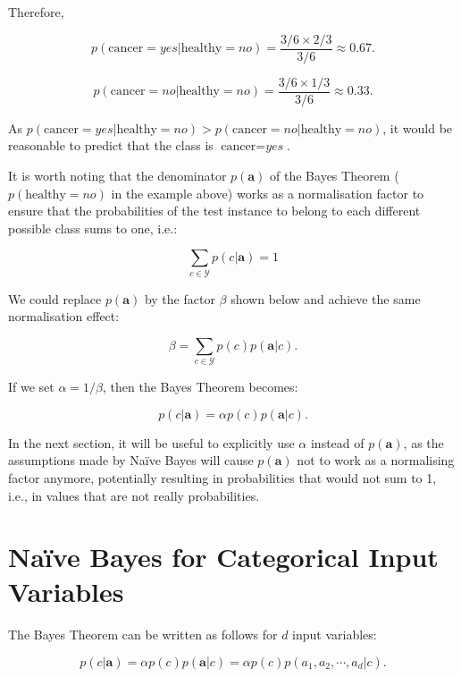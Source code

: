 \vspace{1cm}
Therefore,

\[p(\text{cancer}=\textit{yes}|\text{healthy} = \textit{no}) = \frac{3/6 \times 2/3}{3/6} \approx 0.67.\]

\[p(\text{cancer}=\textit{no}|\text{healthy} = \textit{no}) = \frac{3/6 \times 1/3}{3/6} \approx 0.33.\]

As $p(\text{cancer}=\textit{yes}|\text{healthy} = \textit{no}) > p(\text{cancer}=\textit{no}|\text{healthy} = \textit{no})$, it would be reasonable to predict that the class is $\text{cancer} = \textit{yes}$.


It is worth noting that the denominator $p(\mathbf{a})$ of the Bayes Theorem ($p(\text{healthy} = \textit{no})$ in the example above) works as a normalisation factor to ensure that the probabilities of the test instance to belong to each different possible class sums to one, i.e.:

\[ \sum_{c \in \mathcal{Y}} p(c|\mathbf{a}) = 1\]


We could replace $p(\mathbf{a})$ by the factor $\beta$ shown below and achieve the same normalisation effect:

\[ \beta = \sum_{c \in \mathcal{Y}} p(c) p(\mathbf{a}|c) . \]

If we set $\alpha = 1 / \beta$, then the Bayes Theorem becomes:

\begin{equation}p(c|\mathbf{a}) = \alpha p(c) p(\mathbf{a}|c) . \label{eq:nb-alpha}\end{equation}

In the next section, it will be useful to explicitly use $\alpha$ instead of $p(\mathbf{a})$, as the assumptions made by Na\"{i}ve Bayes will cause $p(\mathbf{a})$ not to work as a normalising factor anymore, potentially resulting in probabilities that would not sum to 1, i.e., in values that are not really probabilities.

\section{Na\"{i}ve Bayes for Categorical Input Variables}
\label{sec:nb-categorical}

The Bayes Theorem can be written as follows for $d$ input variables:

\[p(c|\mathbf{a}) = \alpha p(c) p(\mathbf{a}|c)  = \alpha p(c) p(a_1,a_2,\cdots,a_d|c).\]


